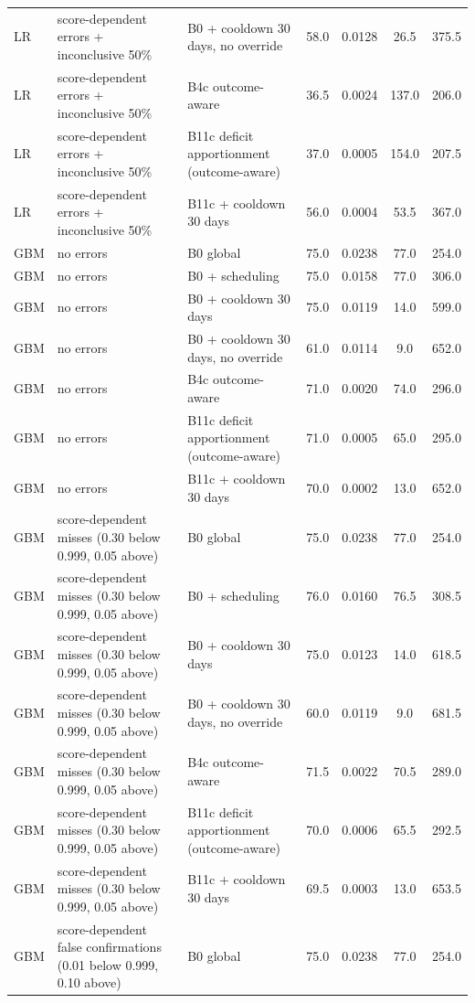 \documentclass[10pt,onecolumn,letterpaper]{article}
\begin{document}
\begin{longtable}{lp{5.2cm}p{4.4cm}cccc}
LR & score-dependent errors + inconclusive 50\% & B0 + cooldown 30 days, no override & 58.0 & 0.0128 & 26.5 & 375.5 \\
LR & score-dependent errors + inconclusive 50\% & B4c outcome-aware & 36.5 & 0.0024 & 137.0 & 206.0 \\
LR & score-dependent errors + inconclusive 50\% & B11c deficit apportionment (outcome-aware) & 37.0 & 0.0005 & 154.0 & 207.5 \\
LR & score-dependent errors + inconclusive 50\% & B11c + cooldown 30 days & 56.0 & 0.0004 & 53.5 & 367.0 \\
GBM & no errors & B0 global & 75.0 & 0.0238 & 77.0 & 254.0 \\
GBM & no errors & B0 + scheduling & 75.0 & 0.0158 & 77.0 & 306.0 \\
GBM & no errors & B0 + cooldown 30 days & 75.0 & 0.0119 & 14.0 & 599.0 \\
GBM & no errors & B0 + cooldown 30 days, no override & 61.0 & 0.0114 & 9.0 & 652.0 \\
GBM & no errors & B4c outcome-aware & 71.0 & 0.0020 & 74.0 & 296.0 \\
GBM & no errors & B11c deficit apportionment (outcome-aware) & 71.0 & 0.0005 & 65.0 & 295.0 \\
GBM & no errors & B11c + cooldown 30 days & 70.0 & 0.0002 & 13.0 & 652.0 \\
GBM & score-dependent misses (0.30 below 0.999, 0.05 above) & B0 global & 75.0 & 0.0238 & 77.0 & 254.0 \\
GBM & score-dependent misses (0.30 below 0.999, 0.05 above) & B0 + scheduling & 76.0 & 0.0160 & 76.5 & 308.5 \\
GBM & score-dependent misses (0.30 below 0.999, 0.05 above) & B0 + cooldown 30 days & 75.0 & 0.0123 & 14.0 & 618.5 \\
GBM & score-dependent misses (0.30 below 0.999, 0.05 above) & B0 + cooldown 30 days, no override & 60.0 & 0.0119 & 9.0 & 681.5 \\
GBM & score-dependent misses (0.30 below 0.999, 0.05 above) & B4c outcome-aware & 71.5 & 0.0022 & 70.5 & 289.0 \\
GBM & score-dependent misses (0.30 below 0.999, 0.05 above) & B11c deficit apportionment (outcome-aware) & 70.0 & 0.0006 & 65.5 & 292.5 \\
GBM & score-dependent misses (0.30 below 0.999, 0.05 above) & B11c + cooldown 30 days & 69.5 & 0.0003 & 13.0 & 653.5 \\
GBM & score-dependent false confirmations (0.01 below 0.999, 0.10 above) & B0 global & 75.0 & 0.0238 & 77.0 & 254.0 \\

\end{longtable}
\end{document}
